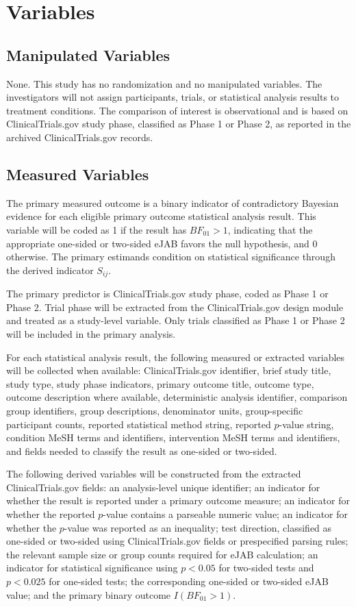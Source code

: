 \documentclass[11pt]{article}
\begin{document}
\section{Variables}

\subsection{Manipulated Variables}

None. This study has no randomization and no manipulated variables. The investigators will not assign participants, trials, or statistical analysis results to treatment conditions. The comparison of interest is observational and is based on ClinicalTrials.gov study phase, classified as Phase 1 or Phase 2, as reported in the archived ClinicalTrials.gov records.

\subsection{Measured Variables}

The primary measured outcome is a binary indicator of contradictory Bayesian evidence for each eligible primary outcome statistical analysis result. This variable will be coded as 1 if the result has \(BF_{01} > 1\), indicating that the appropriate one-sided or two-sided eJAB favors the null hypothesis, and 0 otherwise. The primary estimands condition on statistical significance through the derived indicator \(S_{ij}\).

The primary predictor is ClinicalTrials.gov study phase, coded as Phase 1 or Phase 2. Trial phase will be extracted from the ClinicalTrials.gov design module and treated as a study-level variable. Only trials classified as Phase 1 or Phase 2 will be included in the primary analysis.

For each statistical analysis result, the following measured or extracted variables will be collected when available: ClinicalTrials.gov identifier, brief study title, study type, study phase indicators, primary outcome title, outcome type, outcome description where available, deterministic analysis identifier, comparison group identifiers, group descriptions, denominator units, group-specific participant counts, reported statistical method string, reported \(p\)-value string, condition MeSH terms and identifiers, intervention MeSH terms and identifiers, and fields needed to classify the result as one-sided or two-sided.

The following derived variables will be constructed from the extracted ClinicalTrials.gov fields: an analysis-level unique identifier; an indicator for whether the result is reported under a primary outcome measure; an indicator for whether the reported \(p\)-value contains a parseable numeric value; an indicator for whether the \(p\)-value was reported as an inequality; test direction, classified as one-sided or two-sided using ClinicalTrials.gov fields or prespecified parsing rules; the relevant sample size or group counts required for eJAB calculation; an indicator for statistical significance using \(p < 0.05\) for two-sided tests and \(p < 0.025\) for one-sided tests; the corresponding one-sided or two-sided eJAB value; and the primary binary outcome \(I(BF_{01} > 1)\).
\end{document}
